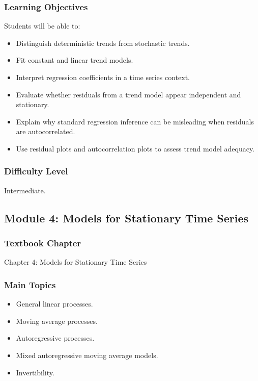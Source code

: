 \documentclass[11pt]{article}
\begin{document}
\subsubsection*{Learning Objectives}
Students will be able to:
\begin{itemize}
    \item Distinguish deterministic trends from stochastic trends.
    \item Fit constant and linear trend models.
    \item Interpret regression coefficients in a time series context.
    \item Evaluate whether residuals from a trend model appear independent and stationary.
    \item Explain why standard regression inference can be misleading when residuals are autocorrelated.
    \item Use residual plots and autocorrelation plots to assess trend model adequacy.
\end{itemize}

\subsubsection*{Difficulty Level}
Intermediate.

\subsection{Module 4: Models for Stationary Time Series}

\subsubsection*{Textbook Chapter}
Chapter 4: Models for Stationary Time Series

\subsubsection*{Main Topics}
\begin{itemize}
    \item General linear processes.
    \item Moving average processes.
    \item Autoregressive processes.
    \item Mixed autoregressive moving average models.
    \item Invertibility.
\end{itemize}
\end{document}
